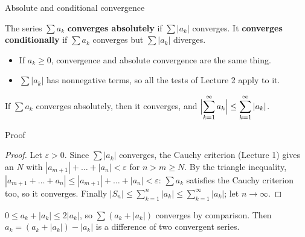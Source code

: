 \documentclass{wosm-slides}
\begin{document}
\begin{frame}{Absolute and conditional convergence}
  \begin{definition}
    The series $\sum a_k$ \textbf{converges absolutely} if $\sum |a_k|$ converges.
    It \textbf{converges conditionally} if $\sum a_k$ converges but $\sum |a_k|$ diverges.
  \end{definition}
  \begin{itemize}
    \item If $a_k \ge 0$, convergence and absolute convergence are the same thing.
    \item $\sum |a_k|$ has nonnegative terms, so all the tests of Lecture 2 apply to it.
  \end{itemize}
  \pause
  \begin{theorem}
    If $\sum a_k$ converges absolutely, then it converges, and
    $\displaystyle\Bigl|\sum_{k=1}^\infty a_k\Bigr| \le \sum_{k=1}^\infty |a_k|$.
  \end{theorem}
\end{frame}

\begin{frame}{Proof}
  \begin{proof}
    Let $\varepsilon > 0$. Since $\sum |a_k|$ converges, the Cauchy criterion
    (Lecture 1) gives an $N$ with $|a_{m+1}| + \dots + |a_n| < \varepsilon$ for
    $n > m \ge N$. By the triangle inequality,
    $|a_{m+1} + \dots + a_n| \le |a_{m+1}| + \dots + |a_n| < \varepsilon$:
    $\sum a_k$ satisfies the Cauchy criterion too, so it converges.
    Finally $|S_n| \le \sum_{k=1}^{n} |a_k| \le \sum_{k=1}^\infty |a_k|$; let $n \to \infty$.
  \end{proof}
  \pause
  \begin{remark}
    $0 \le a_k + |a_k| \le 2|a_k|$, so $\sum (a_k + |a_k|)$ converges by comparison.
    Then $a_k = (a_k + |a_k|) - |a_k|$ is a difference of two convergent series.
  \end{remark}
\end{frame}
\end{document}
